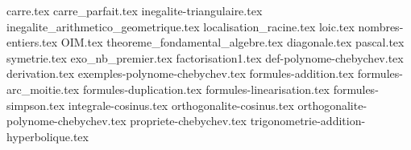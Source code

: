 {carre.tex}
{carre_parfait.tex}
{inegalite-triangulaire.tex}
{inegalite_arithmetico_geometrique.tex}
{localisation_racine.tex}
{loic.tex}
{nombres-entiers.tex}
{OIM.tex}
{theoreme_fondamental_algebre.tex}
{diagonale.tex}
{pascal.tex}
{symetrie.tex}
{exo_nb_premier.tex}
{factorisation1.tex}
{def-polynome-chebychev.tex}
{derivation.tex}
{exemples-polynome-chebychev.tex}
{formules-addition.tex}
{formules-arc_moitie.tex}
{formules-duplication.tex}
{formules-linearisation.tex}
{formules-simpson.tex}
{integrale-cosinus.tex}
{orthogonalite-cosinus.tex}
{orthogonalite-polynome-chebychev.tex}
{propriete-chebychev.tex}
{trigonometrie-addition-hyperbolique.tex}